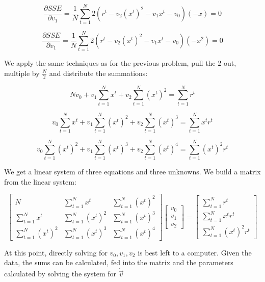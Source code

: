 \documentclass{article}
\newcommand{\mysum} {\sum\limits_{t = 1}^N}
\begin{document}
\begin{equation}
\frac {\partial SSE}{\partial v_1} = \frac{1}{N} \sum\limits_{t = 1}^N 2(r^t - v_2 (x^t)^2 - v_1 x^t - v_0)(-x) = 0
\end{equation}

\begin{equation}
\frac {\partial SSE}{\partial v_1} = \frac{1}{N} \sum\limits_{t = 1}^N 2(r^t - v_2 (x^t)^2 - v_1 x^t - v_0)(-x^2) = 0
\end{equation}

We apply the same techniques as for the previous problem, pull the 2 out, multiple by $\frac{N}{2}$ and distribute the summations:

\begin{equation}
N v_0 + v_1 \mysum x^t + v_2 \mysum (x^t)^2 = \mysum r^t
\end{equation}

\begin{equation}
v_0 \mysum x^t + v_1 \mysum (x^t)^2 + v_2 \mysum (x^t)^3 = \mysum x^t r^t
\end{equation}

\begin{equation}
v_0 \mysum (x^t)^2 + v_1 \mysum (x^t)^3 + v_2 \mysum (x^t)^4 = \mysum (x^t)^2 r^t
\end{equation}


We get a linear system of three equations and three unknowns.  We build a matrix from the linear system:

\[ \begin
{bmatrix}
  N & \mysum x^t & \mysum (x^t)^2 \\
  \mysum x^t & \mysum (x^t)^2 & \mysum (x^t)^3 \\
  \mysum (x^t)^2 & \mysum (x^t)^3 &  \mysum (x^t)^4
 \end{bmatrix}
 \begin{bmatrix}
 	v_0 \\
	v_1 \\
	v_2
 \end{bmatrix}
 =
 \begin{bmatrix}
 	\mysum r^t \\
	\mysum x^t r^t \\
	\mysum (x^t)^2 r^t
 \end{bmatrix}
\]

At this point, directly solving for $v_0, v_1, v_2$ is best left to a computer.  Given the data, the sums can be calculated, fed into the matrix and the parameters calculated by solving the system for $\dot{\vec{v}}$
\end{document}
